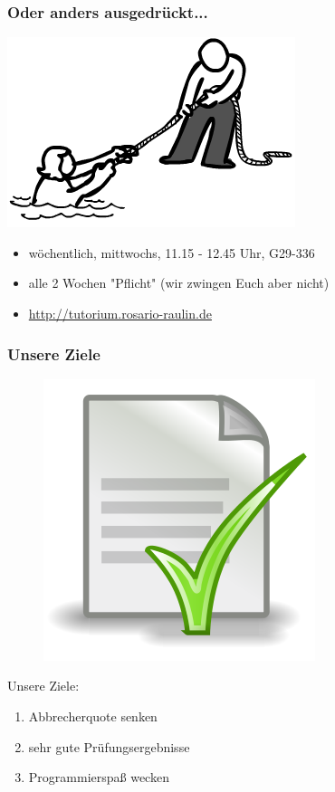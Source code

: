 \documentclass[12pt]{beamer}
\begin{document}
\begin{frame}

	\frametitle{Oder anders ausgedrückt...}

	\pause
	\begin{center}
		\includegraphics[scale=0.42]{src/img/help}
	\end{center}
	\pause

	\begin{itemize}
		\item wöchentlich, mittwochs, 11.15 - 12.45 Uhr, G29-336
		\item alle 2 Wochen "Pflicht" (wir zwingen Euch aber nicht)
		\item \url{http://tutorium.rosario-raulin.de}
	\end{itemize}

\end{frame}

\begin{frame}

	\frametitle{Unsere Ziele}

	\begin{figure}
		\includegraphics[scale=0.15]{src/img/doc}
	\end{figure}

	Unsere Ziele:
	\begin{enumerate}
		\item Abbrecherquote senken
		\item sehr gute Prüfungsergebnisse
		\item Programmierspaß wecken
	\end{enumerate}

\end{frame}
\end{document}
